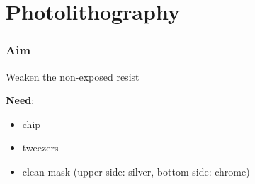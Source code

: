 \documentclass[12pt,a4paper]{report}
\begin{document}
\newpage

\section{Photolithography}

\subsubsection{Aim}
Weaken the non-exposed resist

\noindent \textbf{Need}:
\begin{itemize}[noitemsep]
\item chip
\item tweezers
\item clean mask (upper side: silver, bottom side: chrome)
\end{itemize}
\end{document}
